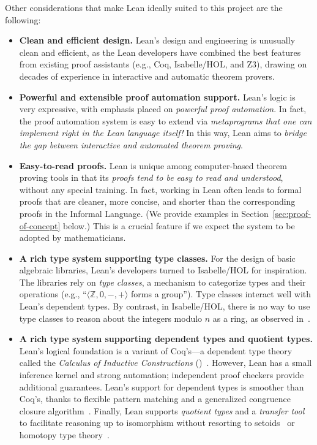 \documentclass[11pt]{amsart}  %
\begin{document}
Other considerations that make Lean ideally suited to this project are the following:
\begin{itemize}
  \item {\bf Clean and efficient design.} Lean's design and engineering is unusually clean and efficient, as the Lean developers have combined the best features from existing proof assistants (e.g., Coq, Isabelle/HOL, and Z3), drawing on decades of experience in interactive and automatic theorem provers. 
  \item {\bf Powerful and extensible proof automation support.}  Lean's logic is very expressive, with emphasis placed on \emph{powerful proof automation}. In fact, the proof automation system is easy to extend via \emph{metaprograms that one can implement right in the Lean language itself!} In this way, Lean aims to \emph{bridge the gap between interactive and automated theorem proving}.
  \item {\bf Easy-to-read proofs.} Lean is unique among computer-based theorem proving tools in that its \emph{proofs tend to be easy to read and understood}, without any special training.  In fact, working in Lean often leads to formal proofs that are cleaner, more concise, and shorter than the corresponding proofs in the Informal Language. (We provide examples in Section~\ref{sec:proof-of-concept} below.) This is a crucial feature if we expect the system to be adopted by mathematicians.  
  \item {\bf A rich type system supporting type classes.} For the design of basic algebraic libraries, Lean's developers turned to Isabelle/HOL for inspiration. The libraries rely on \emph{type classes}, a mechanism to categorize types and their operations (e.g., ``$\langle \mathbb Z, 0, -, +\rangle$ forms a group''). Type classes interact well with Lean's dependent types. By contrast, in Isabelle/HOL, there is no way to use type classes to reason about the integers modulo $n$ as a ring, as observed in~\cite[Section 3.1]{MR3718212}. 
  \item {\bf A rich type system supporting dependent types and quotient types.} Lean's logical foundation is a variant of Coq's---a dependent type theory called the \emph{Calculus of Inductive Constructions} (\cic)~\cite{MR935892}. However, Lean has a small inference kernel and strong automation; independent proof checkers provide additional guarantees. Lean's support for dependent types is smoother than Coq's, thanks to flexible pattern matching and a generalized congruence closure algorithm~\cite{MR3536762}. Finally, Lean supports \emph{quotient types} and a \emph{transfer tool} to facilitate reasoning up to isomorphism without resorting to setoids~\cite{MR1985376} or homotopy type theory~\cite{MR2962717}.
  \end{itemize}
\end{document}
